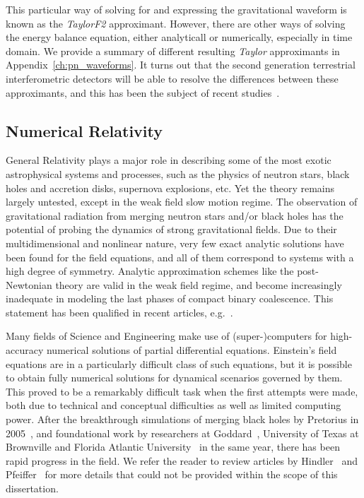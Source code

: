 
This particular way of solving for and expressing the gravitational waveform 
is known as the {\it TaylorF2} approximant. However, there are other ways
of solving the energy balance equation, either analyticall or numerically,
especially in time domain. We provide a summary of different resulting 
{\it Taylor} approximants in Appendix~\ref{ch:pn_waveforms}. It turns out 
that the second generation terrestrial interferometric detectors will be 
able to resolve the differences between these approximants, and this has been 
the subject of recent studies~\cite{Buonanno:2009zt,NRPNComparisonBoyleetal}.

\subsection{Numerical Relativity}
\label{sec:NRWaveforms}

General Relativity plays a major role in describing some of the most exotic 
astrophysical systems and processes, such as the physics of neutron stars, 
black holes and accretion disks, supernova explosions, etc. Yet the theory 
remains largely untested, except in the weak field slow motion regime. 
The observation of gravitational radiation from merging neutron stars and/or
black holes has the potential of probing the dynamics of strong gravitational
fields.
Due to their multidimensional and nonlinear nature, 
very few exact analytic solutions have been found for the field equations, 
and all of them correspond to systems with a high degree of symmetry.
Analytic approximation schemes like the post-Newtonian theory are valid in
the weak field regime, and become increasingly inadequate in 
modeling the last phases of compact binary coalescence. 
This statement has been qualified in recent articles, e.g.~\cite{Nitz:2013mxa}.

Many fields of Science and Engineering make use of (super-)computers for 
high-accuracy numerical solutions of partial differential equations. 
Einstein's field equations are in a particularly difficult class of such
equations, but it is possible to obtain fully numerical solutions for dynamical
scenarios governed by them. This proved to be a remarkably difficult task
when the first attempts were made, both due to technical and conceptual 
difficulties as well as limited computing power. After the breakthrough
simulations of merging black holes by Pretorius in 
2005~\cite{Pretorius2005}, and foundational work by researchers at 
Goddard~\cite{Campanelli:2005dd}, University of Texas at Brownville and Florida
Atlantic University~\cite{Campanelli:2005dd} in the same year, there has been
rapid progress in the field. 
We refer the reader to review articles by Hindler~\cite{Hinder:2010vn} and
Pfeiffer~\cite{Pfeiffer:2012pc} for more details that could not be provided
within the scope of this dissertation. 

